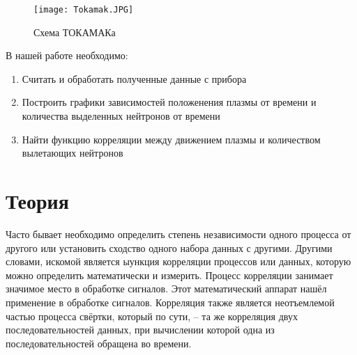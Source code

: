 \documentclass{article}
\begin{document}
\begin{figure}[H]
		\centering
		\texttt{[image: Tokamak.JPG]}
		\caption{Схема ТОКАМАКа}
		\label{fig:sP}
	\end{figure}
\noindent В нашей работе необходимо:
\begin{enumerate}
    \item Считать и обработать полученные данные с прибора
    \item Построить графики зависимостей положенения плазмы от времени и количества выделенных нейтронов от времени
    \item Найти функцию корреляции между движением плазмы и количеством вылетающих нейтронов
\end{enumerate}

\section{Теория}
\noindent Часто бывает необходимо определить степень независимости одного процесса от другого или установить сходство одного набора данных с другими. Другими словами, искомой является ыункция корреляции процессов или данных, которую можно определить математически и измерить. Процесс корреляции занимает значимое место в обработке сигналов. Этот математический аппарат нашёл применение в обработке сигналов. Корреляция также является неотъемлемой частью процесса свёртки, который по сути, -- та же корреляция двух последовательностей данных, при вычислении которой одна из последовательностей обращена во времени.
\end{document}
